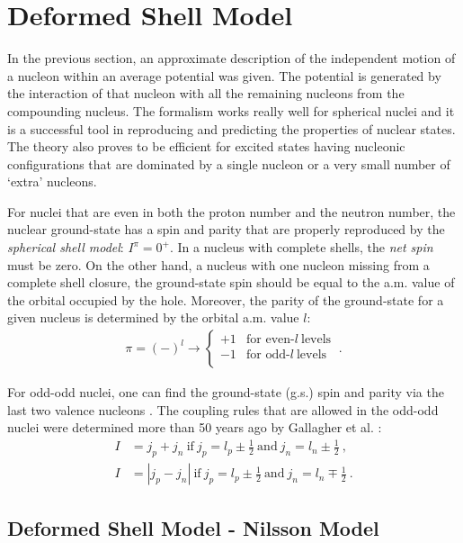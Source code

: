 \section{Deformed Shell Model}

In the previous section, an approximate description of the independent motion of a nucleon within an average potential was given. The potential is generated by the interaction of that nucleon with all the remaining nucleons from the compounding nucleus. The formalism works really well for spherical nuclei and it is a successful tool in reproducing and predicting the properties of nuclear states. The theory also proves to be efficient for excited states having nucleonic configurations that are dominated by a single nucleon or a very small number of `extra' nucleons.

For nuclei that are even in both the proton number and the neutron number, the nuclear ground-state has a spin and parity that are properly reproduced by the \emph{spherical shell model}: $I^\pi=0^+$. In a nucleus with complete shells, the \emph{net spin} must be zero. On the other hand, a nucleus with one nucleon missing from a complete shell closure, the ground-state spin should be equal to the a.m. value of the orbital occupied by the hole. Moreover, the parity of the ground-state for a given nucleus is determined by the orbital a.m. value $l$:
\begin{align}\pi=(-)^l\to
    \begin{cases}
        +1 &\text{for even-}l\ \text{levels}\\
        -1 &\text{for odd-}l\ \text{levels}\\
   \end{cases}\ .
\end{align}

For odd-odd nuclei, one can find the ground-state (g.s.) spin and parity via the last two valence nucleons \cite{krane1991introductory,bertulani2007nuclear}. The coupling rules that are allowed in the odd-odd nuclei were determined more than 50 years ago by Gallagher et al. \cite{gallagher1958coupling}:
\begin{align}
    I&=j_p+j_n\ \text{if}\ j_p=l_p\pm\frac{1}{2}\ \text{and}\ j_n=l_n\pm\frac{1}{2}\ ,\\
    I&=|j_p-j_n|\ \text{if}\ j_p=l_p\pm\frac{1}{2}\ \text{and}\ j_n=l_n\mp\frac{1}{2}\ .
\end{align}

\subsection{Deformed Shell Model - Nilsson Model}
\label{nilsson-model-section}

